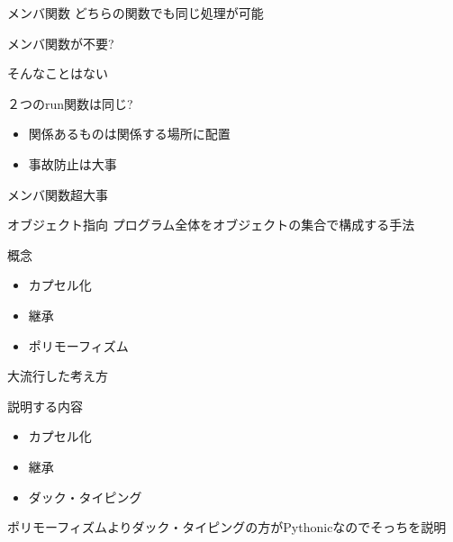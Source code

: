 \documentclass[12pt, xetex, xcolor=pdftex, dvipsnames]{beamer}
\begin{document}
\begin{frame}{メンバ関数}
    どちらの関数でも同じ処理が可能

    \pause メンバ関数が不要?

    \pause \alert{そんなことはない}
\end{frame}
\begin{frame}[fragile]{２つのrun関数は同じ?}
    
    \begin{itemize}
        \item 関係あるものは関係する場所に配置
        \item 事故防止は大事
    \end{itemize}
    \pause
    \alert{メンバ関数超大事}
\end{frame}
\begin{frame}{オブジェクト指向}
    プログラム全体をオブジェクトの集合で構成する手法

    \begin{exampleblock}{概念}
        \begin{itemize}
            \item カプセル化
            \item 継承
            \item ポリモーフィズム
        \end{itemize}
    \end{exampleblock}

    大流行した考え方
\end{frame}
\begin{frame}{説明する内容}
    \begin{itemize}
        \item カプセル化
        \item 継承
        \item ダック・タイピング
    \end{itemize}

    ポリモーフィズムよりダック・タイピングの方がPythonicなのでそっちを説明
\end{frame}
\end{document}
